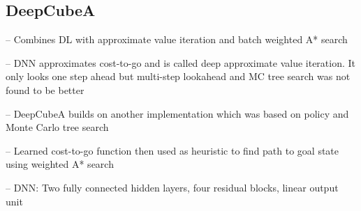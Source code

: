 \documentclass[../main.tex]{subfiles}
\begin{document}
\subsection{DeepCubeA}
\cite{SolvingNature}
-- Combines DL with approximate value iteration and batch weighted A* search

-- DNN approximates cost-to-go and is called deep approximate value iteration. It only looks one step ahead but multi-step lookahead  and MC tree search was not found to be better

-- DeepCubeA builds on another implementation which was based on policy and Monte Carlo tree search 

-- Learned cost-to-go function then used as heuristic to find path to goal state using weighted A* search

-- DNN: Two fully connected hidden layers, four residual blocks, linear output unit
\end{document}

